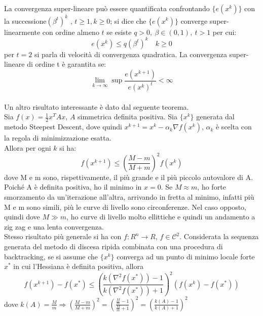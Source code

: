 \documentclass{report}
\begin{document}
La convergenza super-lineare può essere quantificata confrontando $\{e(x^k )\}$ con la successione${(\beta^t)}^k$ , $t \geqslant 1, k \geqslant 0$; si dice che $\{e(x^k )\}$ converge super-linearmente con ordine almeno $t$ se esiste $q > 0,\ \beta \in (0, 1),\ t > 1$ per cui:
\begin{equation}
	e(x^k) \leqslant q {(\beta^t)}^k \quad k \geqslant 0
\end{equation}
per $t = 2$ si parla di velocità di convergenza quadratica. La convergenza super-lineare di ordine t è garantita se:
\begin{equation}
	\lim_{k \rightarrow \infty} \sup \frac{e(x^{k+1})}{e(x^k)^t} < \infty
\end{equation}
\\
Un altro risultato interessante è dato dal seguente teorema.\\
Sia $f(x) = \frac{1}{2} x^T A x$, $A$ simmetrica definita positiva. Sia $\{x^k\}$ generata dal metodo Steepest Descent, dove quindi $x^{k+1} = x^k - \alpha_k \nabla f(x^k)$, $\alpha_k$ è scelta con la regola di minimizzazione esatta.\\
Allora per ogni $k$ si ha:
\begin{equation}
	f(x^{k+1}) \leqslant \left(\frac{M - m}{M + m}\right)^2 f (x^k)
\end{equation}
dove M e m sono, rispettivamente, il più grande e il più piccolo autovalore di A.\\
Poiché A è definita positiva, ho il minimo in $x = 0$. Se $M \approx m$, ho forte smorzamento da un'iterazione all'altra, arrivando in fretta al minimo, infatti più M e m sono simili, più le curve di livello sono circonferenze. Nel caso opposto, quindi dove $M \gg m$, ho curve di livello molto ellittiche e quindi un andamento a zig zag e una lenta convergenza.\\
Stesso risultato più generale si ha con $f : R^n \rightarrow R$, $f \in \mathcal{C}^2$. Considerata la sequenza generata del metodo di discesa ripida combinata con una procedura di backtracking, se si assume che $\{ x^k\}$ converga ad un punto di minimo locale forte $x^*$ in cui l'Hessiana è definita positiva, allora
\begin{equation}
	f(x^{k+1}) - f(x^*) \leqslant \left(\frac{k\left(\nabla^2  f(x^*)\right) - 1}{k\left(\nabla^2  f(x^*)\right) + 1}\right)^2 \left(f(x^k) - f(x^*)\right)
\end{equation}
dove $k(A) = \frac{M}{m} \Rightarrow \left(\frac{M- m}{M+m}\right)^2 = \left(\frac{\frac{M}{m}- 1 }{\frac{M}{m} + 1 }\right)^2 = \left(\frac{k(A)- 1}{k(A)+1}\right)^2 $
\end{document}
